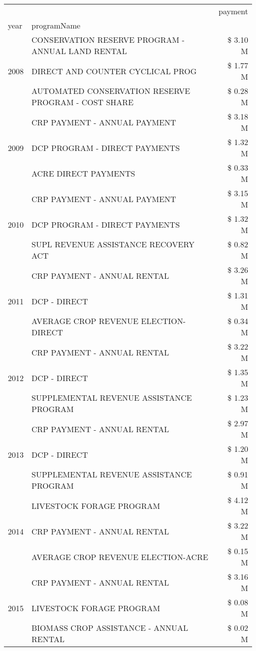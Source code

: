 \begin{tabular}{llr}
\toprule
 &  & payment \\
year & programName &  \\
\midrule
\multirow[t]{3}{*}{2008} & CONSERVATION RESERVE PROGRAM - ANNUAL LAND RENTAL & \$ 3.10 M \\
 & DIRECT AND COUNTER CYCLICAL PROG & \$ 1.77 M \\
 & AUTOMATED CONSERVATION RESERVE PROGRAM - COST SHARE & \$ 0.28 M \\
\cline{1-3}
\multirow[t]{3}{*}{2009} & CRP PAYMENT - ANNUAL PAYMENT & \$ 3.18 M \\
 & DCP PROGRAM - DIRECT PAYMENTS & \$ 1.32 M \\
 & ACRE DIRECT PAYMENTS & \$ 0.33 M \\
\cline{1-3}
\multirow[t]{3}{*}{2010} & CRP PAYMENT - ANNUAL PAYMENT & \$ 3.15 M \\
 & DCP PROGRAM - DIRECT PAYMENTS & \$ 1.32 M \\
 & SUPL REVENUE ASSISTANCE RECOVERY ACT & \$ 0.82 M \\
\cline{1-3}
\multirow[t]{3}{*}{2011} & CRP PAYMENT - ANNUAL RENTAL & \$ 3.26 M \\
 & DCP - DIRECT & \$ 1.31 M \\
 & AVERAGE CROP REVENUE ELECTION-DIRECT & \$ 0.34 M \\
\cline{1-3}
\multirow[t]{3}{*}{2012} & CRP PAYMENT - ANNUAL RENTAL & \$ 3.22 M \\
 & DCP - DIRECT & \$ 1.35 M \\
 & SUPPLEMENTAL REVENUE ASSISTANCE PROGRAM & \$ 1.23 M \\
\cline{1-3}
\multirow[t]{3}{*}{2013} & CRP PAYMENT - ANNUAL RENTAL & \$ 2.97 M \\
 & DCP - DIRECT & \$ 1.20 M \\
 & SUPPLEMENTAL REVENUE ASSISTANCE PROGRAM & \$ 0.91 M \\
\cline{1-3}
\multirow[t]{3}{*}{2014} & LIVESTOCK FORAGE PROGRAM & \$ 4.12 M \\
 & CRP PAYMENT - ANNUAL RENTAL & \$ 3.22 M \\
 & AVERAGE CROP REVENUE ELECTION-ACRE & \$ 0.15 M \\
\cline{1-3}
\multirow[t]{3}{*}{2015} & CRP PAYMENT - ANNUAL RENTAL & \$ 3.16 M \\
 & LIVESTOCK FORAGE PROGRAM & \$ 0.08 M \\
 & BIOMASS CROP ASSISTANCE - ANNUAL RENTAL & \$ 0.02 M \\

\end{tabular}
